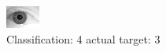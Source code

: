 \begin{figure}[h!]
\begin{center}
\includegraphics[width=0.60\columnwidth]{figures/ID2129_class_4_target_3.png}
\end{center}
\caption{ Classification: 4 actual target: 3}
\label{fig:ID2129_class_4_target_3}
\end{figure}
